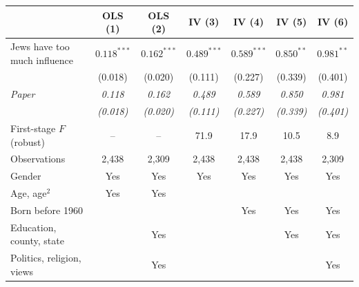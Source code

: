 \begin{tabular}{lcccccc}
\toprule
 & OLS (1) & OLS (2) & IV (3) & IV (4) & IV (5) & IV (6) \\
\midrule
Jews have too much influence & $0.118^{***}$ & $0.162^{***}$ & $0.489^{***}$ & $0.589^{***}$ & $0.850^{**}$ & $0.981^{**}$ \\
 & (0.018) & (0.020) & (0.111) & (0.227) & (0.339) & (0.401) \\
\textit{Paper} & \textit{0.118} & \textit{0.162} & \textit{0.489} & \textit{0.589} & \textit{0.850} & \textit{0.981} \\
 & \textit{(0.018)} & \textit{(0.020)} & \textit{(0.111)} & \textit{(0.227)} & \textit{(0.339)} & \textit{(0.401)} \\
\midrule
First-stage $F$ (robust) & -- & -- & 71.9 & 17.9 & 10.5 & 8.9 \\
Observations & 2,438 & 2,309 & 2,438 & 2,438 & 2,438 & 2,309 \\
Gender & Yes & Yes & Yes & Yes & Yes & Yes \\
Age, age$^2$ & Yes & Yes &  &  &  &  \\
Born before 1960 &  &  &  & Yes & Yes & Yes \\
Education, county, state &  & Yes &  &  & Yes & Yes \\
Politics, religion, views &  & Yes &  &  &  & Yes \\
\bottomrule
\end{tabular}
